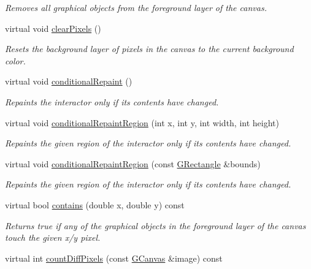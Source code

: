 \begin{DoxyCompactItemize}
\begin{DoxyCompactList}\small\item\em Removes all graphical objects from the foreground layer of the canvas. \end{DoxyCompactList}\item 
virtual void \mbox{\hyperlink{classGCanvas_ab2c8590176aec1da6fb4e9b836bab630}{clear\+Pixels}} ()
\begin{DoxyCompactList}\small\item\em Resets the background layer of pixels in the canvas to the current background color. \end{DoxyCompactList}\item 
virtual void \mbox{\hyperlink{classGDrawingSurface_a221b3e75bb3d9d0bfea62b3364e6773b}{conditional\+Repaint}} ()
\begin{DoxyCompactList}\small\item\em Repaints the interactor only if its contents have changed. \end{DoxyCompactList}\item 
virtual void \mbox{\hyperlink{classGDrawingSurface_aedd4b792311d946eeaf44b0de337a408}{conditional\+Repaint\+Region}} (int x, int y, int width, int height)
\begin{DoxyCompactList}\small\item\em Repaints the given region of the interactor only if its contents have changed. \end{DoxyCompactList}\item 
virtual void \mbox{\hyperlink{classGDrawingSurface_a3932a12278752db368e24fa404e446aa}{conditional\+Repaint\+Region}} (const \mbox{\hyperlink{classGRectangle}{G\+Rectangle}} \&bounds)
\begin{DoxyCompactList}\small\item\em Repaints the given region of the interactor only if its contents have changed. \end{DoxyCompactList}\item 
virtual bool \mbox{\hyperlink{classGCanvas_abb6a5d7c03e6eaaae97264c4799ce7c3}{contains}} (double x, double y) const
\begin{DoxyCompactList}\small\item\em Returns true if any of the graphical objects in the foreground layer of the canvas touch the given x/y pixel. \end{DoxyCompactList}\item 
virtual int \mbox{\hyperlink{classGCanvas_ad3d6147a5e08ed97bb71c7f267ef071b}{count\+Diff\+Pixels}} (const \mbox{\hyperlink{classGCanvas}{G\+Canvas}} \&image) const

\end{DoxyCompactItemize}
